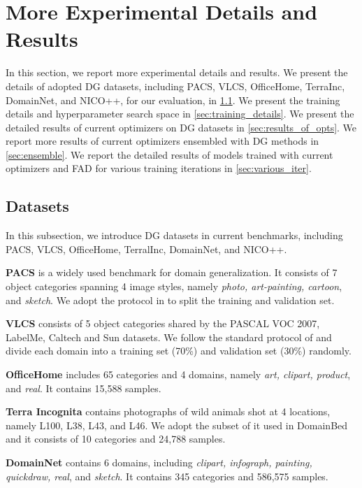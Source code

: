 \section{More Experimental Details and Results}

In this section, we report more experimental details and results. 
We present the details of adopted DG datasets, including PACS, VLCS, OfficeHome, TerraInc, DomainNet, and NICO++, for our evaluation, in \ref{sec:datasets}.
We present the training details and hyperparameter search space in \ref{sec:training_details}.
We present the detailed results of current optimizers on DG datasets in \ref{sec:results_of_opts}. We report more results of current optimizers ensembled with DG methods in \ref{sec:ensemble}. We report the detailed results of models trained with current optimizers and FAD for various training iterations in \ref{sec:various_iter}. 




\subsection{Datasets}
\label{sec:datasets}

In this subsection, we introduce DG datasets in current benchmarks, including PACS, VLCS, OfficeHome, TerralInc, DomainNet, and NICO++.

\textbf{PACS} \cite{li2017deeper} is a widely used benchmark for domain generalization. It consists of 7 object categories spanning 4 image styles, namely \textsl{photo, art-painting, cartoon}, and \textsl{sketch}. We adopt the protocol in \cite{li2017deeper} to split the training and validation set.

\textbf{VLCS} \cite{fang2013unbiased} consists of 5 object categories shared by the PASCAL VOC 2007, LabelMe, Caltech and Sun datasets. We follow the standard protocol of \cite{ghifary2015domain} and divide each domain into a training set (70\%) and validation set (30\%) randomly. 

\textbf{OfficeHome} \cite{venkateswara2017deep} includes 65 categories and 4 domains, namely \textsl{art, clipart, product}, and \textsl{real}. It contains 15,588 samples.

\textbf{Terra Incognita} \cite{beery2018recognition} contains photographs of wild animals shot at 4 locations, namely L100, L38, L43, and L46. We adopt the subset of it used in DomainBed\cite{gulrajani2020search} and it consists of 10 categories and 24,788 samples.

\textbf{DomainNet} \cite{peng2019moment} contains 6 domains, including \textsl{clipart, infograph, painting, quickdraw, real}, and \textsl{sketch}. It contains 345 categories and 586,575 samples. 

